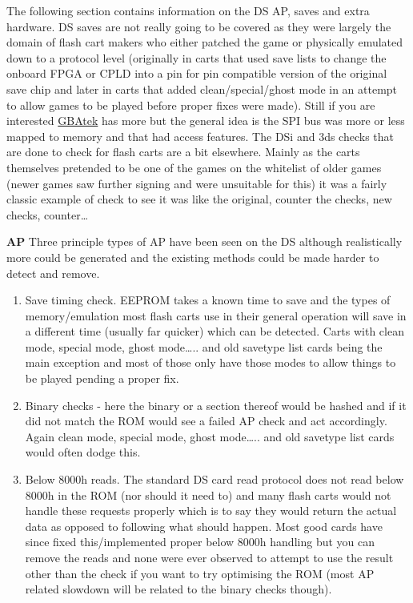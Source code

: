 \documentclass[
]{book}
\providecommand{\tightlist}{%
  \setlength{\itemsep}{0pt}\setlength{\parskip}{0pt}}
\begin{document}
The following section contains information on the DS AP, saves and extra hardware. DS saves are not really going to be covered as they were largely the domain of flash cart makers who either patched the game or physically emulated down to a protocol level (originally in carts that used save lists to change the onboard FPGA or CPLD into a pin for pin compatible version of the original save chip and later in carts that added clean/special/ghost mode in an attempt to allow games to be played before proper fixes were made). Still if you are interested \href{http://problemkaputt.de/gbatek.htm\#dscartridgebackup}{GBAtek} has more but the general idea is the SPI bus was more or less mapped to memory and that had access features. The DSi and 3ds checks that are done to check for flash carts are a bit elsewhere. Mainly as the carts themselves pretended to be one of the games on the whitelist of older games (newer games saw further signing and were unsuitable for this) it was a fairly classic example of check to see it was like the original, counter the checks, new checks, counter\ldots{}

\textbf{AP} Three principle types of AP have been seen on the DS although realistically more could be generated and the existing methods could be made harder to detect and remove.

\begin{enumerate}
\def\labelenumi{\arabic{enumi}.}
\tightlist
\item
  Save timing check. EEPROM takes a known time to save and the types of memory/emulation most flash carts use in their general operation will save in a different time (usually far quicker) which can be detected. Carts with clean mode, special mode, ghost mode\ldots.. and old savetype list cards being the main exception and most of those only have those modes to allow things to be played pending a proper fix.
\item
  Binary checks - here the binary or a section thereof would be hashed and if it did not match the ROM would see a failed AP check and act accordingly. Again clean mode, special mode, ghost mode\ldots.. and old savetype list cards would often dodge this.
\item
  Below 8000h reads. The standard DS card read protocol does not read below 8000h in the ROM (nor should it need to) and many flash carts would not handle these requests properly which is to say they would return the actual data as opposed to following what should happen. Most good cards have since fixed this/implemented proper below 8000h handling but you can remove the reads and none were ever observed to attempt to use the result other than the check if you want to try optimising the ROM (most AP related slowdown will be related to the binary checks though).
\end{enumerate}
\end{document}
